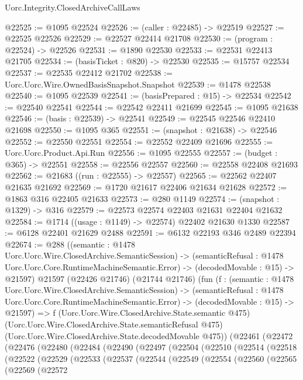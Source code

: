 \begin{lexlean}{Uorc.Integrity.ClosedArchiveCallLaws}
\begin{coremodule}
@22525 := @1095 @22524
@22526 := (caller : @22485) -> @22519
@22527 := @22525 @22526
@22529 := @22527 @22414 @21708
@22530 := (program : @22524) -> @22526
@22531 := @1890 @22530
@22533 := @22531 @22413 @21705
@22534 := (basisTicket : @820) -> @22530
@22535 := @15757 @22534
@22537 := @22535 @22412 @21702
@22538 := Uorc.Uorc.Wire.OwnedBasisSnapshot.Snapshot
@22539 := @1478 @22538
@22540 := @1095 @22539
@22541 := (basisPrepared : @15) -> @22534
@22542 := @22540 @22541
@22544 := @22542 @22411 @21699
@22545 := @1095 @21638
@22546 := (basis : @22539) -> @22541
@22549 := @22545 @22546 @22410 @21698
@22550 := @1095 @365
@22551 := (snapshot : @21638) -> @22546
@22552 := @22550 @22551
@22554 := @22552 @22409 @21696
@22555 := Uorc.Uorc.Product.Api.Run
@22556 := @1095 @22555
@22557 := (budget : @365) -> @22551
@22558 := @22556 @22557
@22560 := @22558 @22408 @21693
@22562 := @21683 ((run : @22555) -> @22557)
@22565 := @22562 @22407 @21635 @21692
@22569 := @1720 @21617 @22406 @21634 @21628
@22572 := @1863 @316 @22405 @21633
@22573 := @280 @1149
@22574 := (snapshot : @1329) -> @316
@22579 := @22573 @22574 @22403 @21631 @22404 @21632
@22584 := @1714 ((usage : @1149) -> @22574) @22402 @21630 @1330
@22587 := @6128 @22401 @21629 @2488
@22591 := @6132 @22193 @346 @2489 @22394
@22674 := @288
    ((semantic : @1478 Uorc.Uorc.Wire.ClosedArchive.SemanticSession) ->
    (semanticRefusal : @1478 Uorc.Uorc.Core.RuntimeMachineSemantic.Error) ->
    (decodedMovable : @15) -> @21597)
    @21597
    (@22426 @21746)
    (@21744 @21746)
    (fun (f : (semantic : @1478 Uorc.Uorc.Wire.ClosedArchive.SemanticSession) ->
    (semanticRefusal : @1478 Uorc.Uorc.Core.RuntimeMachineSemantic.Error) ->
    (decodedMovable : @15) -> @21597) =>
    f
      (Uorc.Uorc.Wire.ClosedArchive.State.semantic @475)
      (Uorc.Uorc.Wire.ClosedArchive.State.semanticRefusal @475)
      (Uorc.Uorc.Wire.ClosedArchive.State.decodedMovable @475))
    (@22461
      (@22472
        (@22476
          (@22480
            (@22484
              (@22490
                (@22497
                  (@22504
                    (@22510
                      (@22514
                        (@22518
                          (@22522
                            (@22529
                              (@22533
                                (@22537
                                  (@22544
                                    (@22549
                                      (@22554
                                        (@22560
                                          (@22565
                                            (@22569
                                              (@22572

\end{coremodule}
\end{lexlean}
